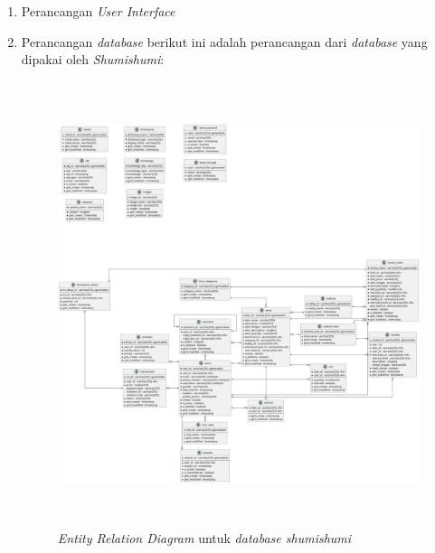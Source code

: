 \documentclass[a4paper]{article}
\begin{document}
\begin{enumerate}
    \item Perancangan \textit{User Interface}
    \newpage

    \item Perancangan \textit{database}
    berikut ini adalah perancangan dari \textit{database} yang dipakai oleh \textit{Shumishumi}:
    \begin{figure}[h]
        \centering
        \includegraphics*[height=13cm]{./diagram/erd/erd.png}
        \caption{\textit{Entity Relation Diagram} untuk \textit{database shumishumi}}
    \end{figure}
\end{enumerate}


\newpage
{}
\printbibliography[title=Referensi]
\end{document}
